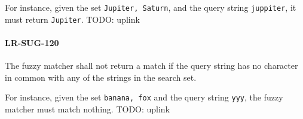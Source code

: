 For instance, given the set \lstinline{Jupiter, Saturn}, and the
query string \lstinline{juppiter}, it must return \lstinline{Jupiter}.
TODO: uplink

\paragraph{LR-SUG-120}
The fuzzy matcher shall not return a match if the query string
has no character in common with any of the strings in the search
set.

For instance, given the set \lstinline{banana, fox} and the query
string \lstinline{yyy}, the fuzzy matcher must match nothing.
TODO: uplink
